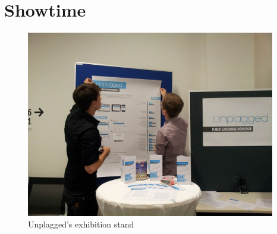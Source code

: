 \begin{appendix}
\begin{landscape}

\end{landscape}









\chapter{Showtime}

\begin{figure}[!h]
  \centering
    \includegraphics[width=0.97\textwidth]{images/unplagged_exhibition_stand1.jpg}
  \caption{Unplagged's exhibition stand}
  \label{fig:unplagged_exhibition_stand1}
\end{figure}


\end{appendix}
